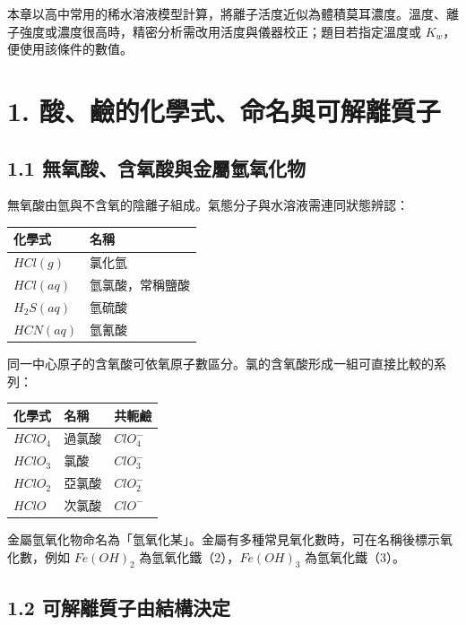 \documentclass[11pt,a4paper]{article}
\newcounter{none}
\begin{document}
本章以高中常用的稀水溶液模型計算，將離子活度近似為體積莫耳濃度。溫度、離子強度或濃度很高時，精密分析需改用活度與儀器校正；題目若指定溫度或 \(K_w\)，便使用該條件的數值。

\section{1. 酸、鹼的化學式、命名與可解離質子}\label{ux9178ux9e7cux7684ux5316ux5b78ux5f0fux547dux540dux8207ux53efux89e3ux96e2ux8ceaux5b50}

\subsection{1.1 無氧酸、含氧酸與金屬氫氧化物}\label{ux7121ux6c27ux9178ux542bux6c27ux9178ux8207ux91d1ux5c6cux6c2bux6c27ux5316ux7269}

無氧酸由氫與不含氧的陰離子組成。氣態分子與水溶液需連同狀態辨認：

{\def\LTcaptype{none} %
\begin{longtable}[]{@{}ll@{}}
\toprule\noalign{}
化學式 & 名稱 \\
\midrule\noalign{}
\endhead
\bottomrule\noalign{}
\endlastfoot
\(HCl(g)\) & 氯化氫 \\
\(HCl(aq)\) & 氫氯酸，常稱鹽酸 \\
\(H_2S(aq)\) & 氫硫酸 \\
\(HCN(aq)\) & 氫氰酸 \\
\end{longtable}
}

同一中心原子的含氧酸可依氧原子數區分。氯的含氧酸形成一組可直接比較的系列：

{\def\LTcaptype{none} %
\begin{longtable}[]{@{}lll@{}}
\toprule\noalign{}
化學式 & 名稱 & 共軛鹼 \\
\midrule\noalign{}
\endhead
\bottomrule\noalign{}
\endlastfoot
\(HClO_4\) & 過氯酸 & \(ClO_4^-\) \\
\(HClO_3\) & 氯酸 & \(ClO_3^-\) \\
\(HClO_2\) & 亞氯酸 & \(ClO_2^-\) \\
\(HClO\) & 次氯酸 & \(ClO^-\) \\
\end{longtable}
}

金屬氫氧化物命名為「氫氧化某」。金屬有多種常見氧化數時，可在名稱後標示氧化數，例如 \(Fe(OH)_2\) 為氫氧化鐵（2），\(Fe(OH)_3\) 為氫氧化鐵（3）。

\subsection{1.2 可解離質子由結構決定}\label{ux53efux89e3ux96e2ux8ceaux5b50ux7531ux7d50ux69cbux6c7aux5b9a}
\end{document}
